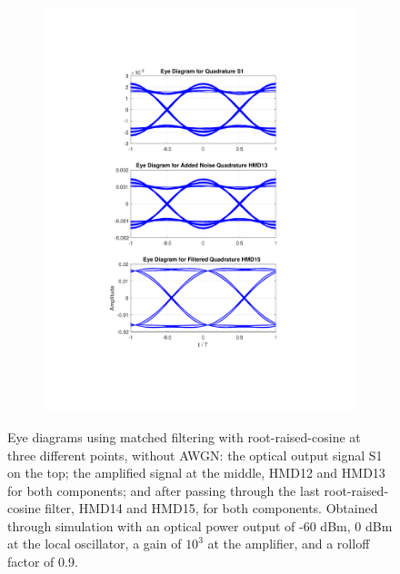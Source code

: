 \begin{figure}[H]
\begin{subfigure}{.45\textwidth}
		\includegraphics[clip, trim=5cm 4cm 5cm 4cm, width=\textwidth]{./sdf/m_qam_system/figures/eyes/q_nn_p_60_09.pdf}
	\end{subfigure}
	
	\caption{Eye diagrams using matched filtering with root-raised-cosine at three different points, without AWGN: the optical output signal S1 on the top; the amplified signal at the middle, HMD12 and HMD13 for both components; and after passing through the last root-raised-cosine filter, HMD14 and HMD15, for both components. Obtained through simulation with an optical power output of -60 dBm, 0 dBm at the local oscillator, a gain of $10^3$ at the amplifier, and a rolloff factor of 0.9.\label{fig:eyes_nn_rrc_09}}
	
\end{figure}

